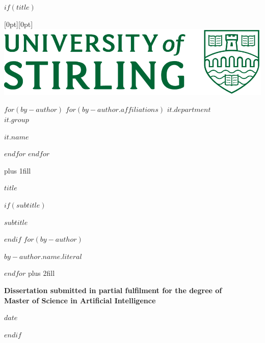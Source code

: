 
$if(title)$

\cleardoublepage
\thispagestyle{empty}

\hspace{10cm} %
\raisebox{0.75cm}[0pt][0pt]{\includegraphics[width=0.4\linewidth]{uos_logo.png}}

\begin{center}

$for(by-author)$
$for(by-author.affiliations)$
{\Large \textit{$it.department$} \\}
{\Large \textit{$it.group$} \\}
{\Large \textit{$it.name$} \par}
$endfor$
$endfor$

\hbox{}\vskip 0cm plus 1fill
{\LARGE\bfseries $title$ \par}
$if(subtitle)$
{\Large\bfseries $subtitle$ \par}
$endif$
\vspace{10ex}
$for(by-author)$
{\Large\bfseries $by-author.name.literal$ \par}
$endfor$
\vskip 0.5cm plus 2fill

{\bfseries Dissertation submitted in partial fulfilment for the degree of \\
Master of Science in Artificial Intelligence \par}
\vspace{2ex}
{\bfseries $date$ \par}

\end{center}
$endif$

\clearpage
{}
\setcounter{page}{1}
